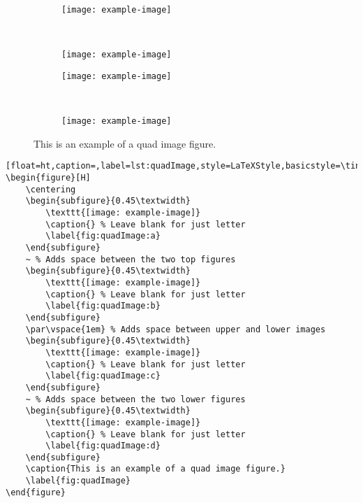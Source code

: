 		\vspace*{\fill}
		\pagebreak



		\vspace*{\fill}
		\begin{figure}[H]
			\centering
			\begin{subfigure}{0.45\textwidth}
				\texttt{[image: example-image]}
				\caption{} %
				\label{fig:quadImage:a}
			\end{subfigure}
			~ %
			\begin{subfigure}{0.45\textwidth}
				\texttt{[image: example-image]}
				\caption{} %
				\label{fig:quadImage:b}
			\end{subfigure}
			\par\vspace{1em} %
			\begin{subfigure}{0.45\textwidth}
				\texttt{[image: example-image]}
				\caption{} %
				\label{fig:quadImage:c}
			\end{subfigure}
			~ %
			\begin{subfigure}{0.45\textwidth}
				\texttt{[image: example-image]}
				\caption{} %
				\label{fig:quadImage:d}
			\end{subfigure}
			\caption{This is an example of a quad image figure.}
			\label{fig:quadImage}
		\end{figure}
		\begin{lstlisting}[float=ht,caption=,label=lst:quadImage,style=LaTeXStyle,basicstyle=\tiny\ttfamily,]
\begin{figure}[H]
	\centering
	\begin{subfigure}{0.45\textwidth}
		\texttt{[image: example-image]}
		\caption{} % Leave blank for just letter
		\label{fig:quadImage:a}
	\end{subfigure}
	~ % Adds space between the two top figures
	\begin{subfigure}{0.45\textwidth}
		\texttt{[image: example-image]}
		\caption{} % Leave blank for just letter
		\label{fig:quadImage:b}
	\end{subfigure}
	\par\vspace{1em} % Adds space between upper and lower images
	\begin{subfigure}{0.45\textwidth}
		\texttt{[image: example-image]}
		\caption{} % Leave blank for just letter
		\label{fig:quadImage:c}
	\end{subfigure}
	~ % Adds space between the two lower figures
	\begin{subfigure}{0.45\textwidth}
		\texttt{[image: example-image]}
		\caption{} % Leave blank for just letter
		\label{fig:quadImage:d}
	\end{subfigure}
	\caption{This is an example of a quad image figure.}
	\label{fig:quadImage}
\end{figure}
		\end{lstlisting}
		\vspace*{\fill}
		\pagebreak